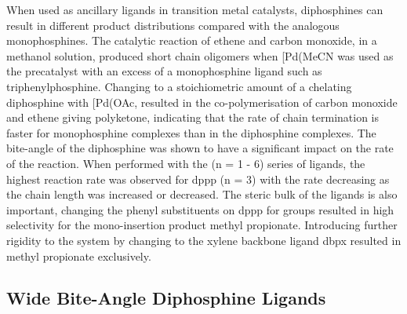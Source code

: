 When used as ancillary ligands in transition metal catalysts, diphosphines can result in different product distributions compared with the analogous monophosphines.  The catalytic reaction of ethene and carbon monoxide, in a methanol solution, produced short chain oligomers when [Pd(MeCN\ce{)4](BF4)2} was used as the precatalyst with an excess of a monophosphine ligand such as triphenylphosphine.\cite{Lai1984}  Changing to a stoichiometric amount of a chelating diphosphine with  [Pd(OAc\ce{)2]}, resulted in the co-polymerisation of carbon monoxide and ethene giving polyketone, indicating that the rate of chain termination is faster for mono\-phosphine complexes than in the diphosphine complexes.\cite{Drent1991}  The bite-angle of the di\-phos\-phine was shown to have a significant impact on the rate of the reaction.  When performed with the  (n = 1 - 6) series of ligands, the highest reaction rate was observed for \gls{dppp} (n = 3) with the rate decreasing as the chain length was increased or decreased.\cite{Drent1991}  The steric bulk of the ligands is also important, changing the phenyl substituents on \acrshort{dppp} for \tBu{} groups resulted in high selectivity for the mono-insertion product methyl propionate.\cite{Leeuwenbook2000}  Introducing further rigidity to the system by changing to the xylene backbone ligand \gls{dbpx} resulted in methyl propionate exclusively.\cite{Eastham2000}

\subsection{Wide Bite-Angle Diphosphine Ligands}

